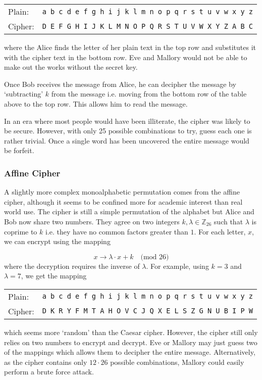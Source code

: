 \begin{center}
\begin{tabular}{l l}%
	Plain:  &\quad\texttt{a b c d e f g h i j k l m n o p q r s t u v w x y z} \\ 
	Cipher: &\quad\texttt{D E F G H I J K L M N O P Q R S T U V W X Y Z A B C} \\
\end{tabular}
\end{center}
where the Alice finds the letter of her plain text in the top row and substitutes it with the cipher text in the bottom row. Eve and Mallory would not be able to make out the works without the secret key. 

Once Bob receives the message from Alice, he can decipher the message by `subtracting' $k$ from the message i.e. moving from the bottom row of the table above to the top row. This allows him to read the message.

In an era where most people would have been illiterate, the cipher was likely to be secure. However, with only 25 possible combinations to try, guess each one is rather trivial. Once a single word has been uncovered the entire message would be forfeit. 

\subsubsection*{Affine Cipher}

A slightly more complex monoalphabetic permutation comes from the affine cipher, although it seems to be confined more for academic interest than real world use. The cipher is still a simple permutation of the alphabet but Alice and Bob now share two numbers. They agree on two integers $k,\lambda\in \mathbb{Z}_{26}$ such that $\lambda$ is coprime to $k$ i.e. they have no common factors greater than $1$. For each letter, $x$, we can encrypt using the mapping

\begin{equation}
	x \rightarrow \lambda \cdot x + k\quad\text{(mod 26)}
\end{equation}
where the decryption requires the inverse of $\lambda$. For example, using $k = 3$ and $\lambda = 7$, we get the mapping

\begin{center}
\begin{tabular}{l l}
	Plain:  &\quad\texttt{a b c d e f g h i j k l m n o p q r s t u v w x y z} \\ 
	Cipher: &\quad\texttt{D K R  Y F M T A H O V C J Q X E L S Z G N U B I P W} \\
\end{tabular}
\end{center}
which seems more `random' than the Caesar cipher. However, the cipher still only relies on two numbers to encrypt and decrypt. Eve or Mallory may just guess two of the mappings which allows them to decipher the entire message. Alternatively, as the cipher contains only $12 \cdot 26$ possible combinations, Mallory could easily perform a brute force attack.

